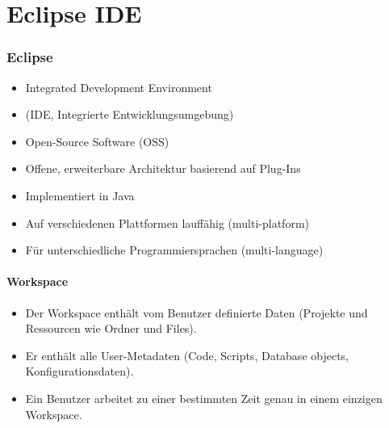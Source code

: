 
\part{Eclipse IDE}

\begin{multicols}{2}
\section{Eclipse}
\begin{itemize}
	\item Integrated Development Environment
	\item[\-] (IDE, Integrierte Entwicklungsumgebung)
	\item Open-Source Software (OSS)
	\item Offene, erweiterbare Architektur basierend auf Plug-Ins
	\item Implementiert in Java
	\item Auf verschiedenen Plattformen lauffähig (multi-platform)
	\item Für unterschiedliche Programmiersprachen (multi-language)
\end{itemize}
\vfill\null
\columnbreak
\subsection{Workspace}
\begin{itemize}
	\item Der Workspace enthält vom Benutzer definierte Daten (Projekte und Ressourcen wie Ordner und Files).
	\item Er enthält alle User-Metadaten (Code, Scripts, Database objects, Konfigurationsdaten).
	\item Ein Benutzer arbeitet zu einer bestimmten Zeit genau in einem einzigen Workspace.
\end{itemize}
\end{multicols}

